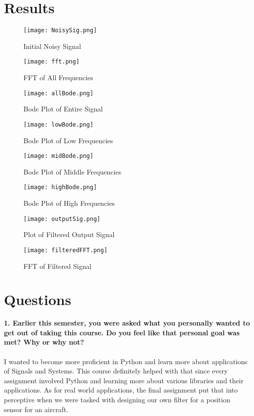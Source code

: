 \documentclass[12pt]{report}
\begin{document}
\section{Results}

\begin{figure}[htp]
    \centering
    \texttt{[image: NoisySig.png]}
    \caption{Initial Noisy Signal}
\end{figure}

\begin{figure}[htp]
    \centering
    \texttt{[image: fft.png]}
    \caption{FFT of All Frequencies}
\end{figure}

\begin{figure}[htp]
    \centering
    \texttt{[image: allBode.png]}
    \caption{Bode Plot of Entire Signal}
\end{figure}

\begin{figure}[htp]
    \centering
    \texttt{[image: lowBode.png]}
    \caption{Bode Plot of Low Frequencies}
\end{figure}

\begin{figure}[htp]
    \centering
    \texttt{[image: midBode.png]}
    \caption{Bode Plot of Middle Frequencies}
\end{figure}

\begin{figure}[htp]
    \centering
    \texttt{[image: highBode.png]}
    \caption{Bode Plot of High Frequencies}
\end{figure}

\begin{figure}[htp]
    \centering
    \texttt{[image: outputSig.png]}
    \caption{Plot of Filtered Output Signal}
\end{figure}

\begin{figure}[htp]
    \centering
    \texttt{[image: filteredFFT.png]}
    \caption{FFT of Filtered Signal}
\end{figure}

\pagebreak

\section{Questions}
\textbf{1. Earlier this semester, you were asked what you personally wanted to get out of taking this
course. Do you feel like that personal goal was met? Why or why not?} \\ \\
I wanted to become more proficient in Python and learn more about applications of Signals and Systems. This course definitely helped with that since every assignment involved Python and learning more about various libraries and their applications. As for real world applications, the final assignment put that into perceptive when we were tasked with designing our own filter for a position sensor for an aircraft.
\end{document}
